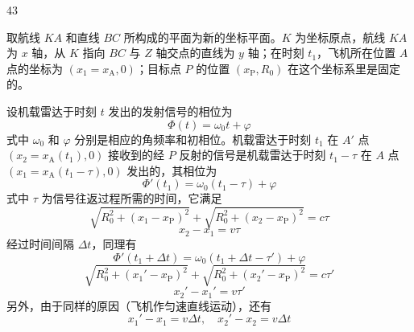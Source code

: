 \begin{solution}{43}
    \begin{subsolution}
        取航线 $KA$ 和直线 $BC$ 所构成的平面为新的坐标平面。$K$ 为坐标原点，航线 $KA$ 为 $x$ 轴，从 $K$ 指向 $BC$ 与 $Z$ 轴交点的直线为 $y$ 轴；在时刻 $t_{1}$，飞机所在位置 $A$ 点的坐标为 $(x_{1} = x_{\mathrm{A}}, 0)$；目标点 $P$ 的位置 $(x_{\mathrm{P}}, R_{0})$ 在这个坐标系里是固定的。

        设机载雷达于时刻 $t$ 发出的发射信号的相位为
        \begin{equation}
            \Phi(t) = \omega_{0} t + \varphi
            \label{eq:1.s43}
        \end{equation}
        式中 $\omega_{0}$ 和 $\varphi$ 分别是相应的角频率和初相位。机载雷达于时刻 $t_{1}$ 在 $A'$ 点 $(x_{2} = x_{\mathrm{A}}(t_{1}), 0)$ 接收到的经 $P$ 反射的信号是机载雷达于时刻 $t_{1} - \tau$ 在 $A$ 点 $(x_{1} = x_{\mathrm{A}}(t_{1} - \tau), 0)$ 发出的，其相位为
        \begin{equation}
            \Phi'(t_{1}) = \omega_{0}(t_{1} - \tau) + \varphi
            \label{eq:2.s43}
        \end{equation}
        式中 $\tau$ 为信号往返过程所需的时间，它满足
        \begin{equation}
            \sqrt{R_{0}^{2} + (x_{1} - x_{\mathrm{P}})^{2}} + \sqrt{R_{0}^{2} + (x_{2} - x_{\mathrm{P}})^{2}} = c\tau
            \label{eq:3.s43}
        \end{equation}
        \begin{equation}
            x_{2} - x_{1} = v\tau
            \label{eq:4.s43}
        \end{equation}
        经过时间间隔 $\Delta t$，同理有
        \begin{equation}
            \Phi'(t_{1} + \Delta t) = \omega_{0}(t_{1} + \Delta t - \tau') + \varphi
            \label{eq:5.s43}
        \end{equation}
        \begin{equation}
            \sqrt{R_{0}^{2} + (x_{1}' - x_{\mathrm{P}})^{2}} + \sqrt{R_{0}^{2} + (x_{2}' - x_{\mathrm{P}})^{2}} = c\tau'
            \label{eq:6.s43}
        \end{equation}
        \begin{equation}
            x_{2}' - x_{1}' = v\tau'
            \label{eq:7.s43}
        \end{equation}
        另外，由于同样的原因（飞机作匀速直线运动），还有
        \begin{equation}
            x_{1}' - x_{1} = v\Delta t,\quad x_{2}' - x_{2} = v\Delta t

\end{equation}
\end{subsolution}
\end{solution}
